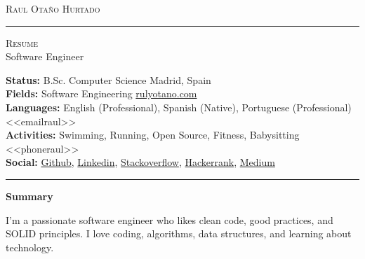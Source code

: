 \documentclass[10pt,A4]{article}
\newcommand{\cvsection}[1]
{
	\begin{center}
		\large\textcolor{sectcol}{\textbf{#1}}
	\end{center}
}
\newcommand{\metasection}[2]
{
\footnotesize{#2} \hspace*{\fill} \footnotesize{#1}\\[1pt]
}
\begin{document}



\vspace{-8pt}
\begin{center}
	\HUGE \textsc{Raul Otaño Hurtado} \textcolor{sectcol}{\rule[-1mm]{1mm}{0.9cm}} \textsc{Resume}\\[2pt]
	\small Software Engineer
\end{center}



\vspace{6pt}


\metasection{Madrid, Spain}{\textbf{Status:} B.Sc. Computer Science}
\metasection{\href{https://rulyotano.com}{rulyotano.com}}{\textbf{Fields:} Software Engineering} 
\metasection{<<emailraul>>}{\textbf{Languages:} English (Professional), Spanish (Native), Portuguese (Professional)}
\metasection{<<phoneraul>>}{\textbf{Activities:} Swimming, Running, Open Source, Fitness, Babysitting}
\metasection{}{\textbf{Social:} \href{https://github.com/rulyotano}{Github}, \href{https://www.linkedin.com/in/raulotanohurtado}{Linkedin}, \href{https://stackoverflow.com/users/1655482}{Stackoverflow}, \href{https://www.hackerrank.com/rulyotano}{Hackerrank}, \href{https://medium.com/@rulyotano}{Medium}}
\vspace{-2pt}
\textcolor{softcol}{\hrule}
\vspace{6pt}

\normalsize

\vspace{-6pt}
\cvsection{Summary}
I'm a passionate software engineer who likes clean code, good practices, and SOLID principles. I love coding, algorithms, data structures, and learning about technology.\\
\end{document}
